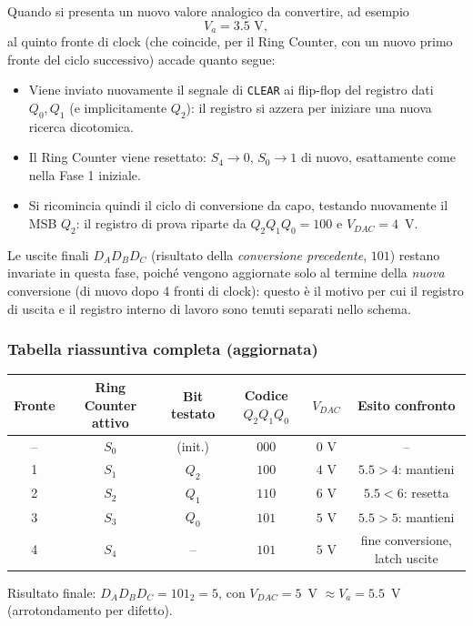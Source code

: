 \documentclass[11pt,a4paper]{report}
\begin{document}
Quando si presenta un nuovo valore analogico da convertire, ad esempio
\[
V_a = 3.5\text{ V},
\]
al quinto fronte di clock (che coincide, per il Ring Counter, con un nuovo primo fronte del ciclo successivo) accade quanto segue:

\begin{itemize}
    \item Viene inviato nuovamente il segnale di \texttt{CLEAR} ai flip-flop del registro dati $Q_0,Q_1$ (e implicitamente $Q_2$): il registro si azzera per iniziare una nuova ricerca dicotomica.
    \item Il Ring Counter viene resettato: $S_4\to 0$, $S_0 \to 1$ di nuovo, esattamente come nella Fase 1 iniziale.
    \item Si ricomincia quindi il ciclo di conversione da capo, testando nuovamente il MSB $Q_2$: il registro di prova riparte da $Q_2Q_1Q_0=100$ e $V_{DAC}=4$~V.
\end{itemize}

Le uscite finali $D_A D_B D_C$ (risultato della \emph{conversione precedente}, $101$) restano invariate in questa fase, poich\'e vengono aggiornate solo al termine della \emph{nuova} conversione (di nuovo dopo 4 fronti di clock): questo è il motivo per cui il registro di uscita e il registro interno di lavoro sono tenuti separati nello schema.

\bigskip
\subsubsection{Tabella riassuntiva completa (aggiornata)}

\begin{center}
\begin{tabular}{c c c c c c}
\hline
\textbf{Fronte} & \textbf{Ring Counter attivo} & \textbf{Bit testato} & \textbf{Codice} $Q_2Q_1Q_0$ & $V_{DAC}$ & \textbf{Esito confronto} \\
\hline
--   & $S_0$ & (init.) & $000$ & $0$ V  & -- \\
1    & $S_1$ & $Q_2$   & $100$ & $4$ V  & $5.5>4$: mantieni \\
2    & $S_2$ & $Q_1$   & $110$ & $6$ V  & $5.5<6$: resetta \\
3    & $S_3$ & $Q_0$   & $101$ & $5$ V  & $5.5>5$: mantieni \\
4    & $S_4$ & --      & $101$ & $5$ V  & fine conversione, latch uscite \\
\hline
\end{tabular}
\end{center}

Risultato finale: $D_AD_BD_C = 101_2 = 5$, con $V_{DAC}=5$~V $\approx V_a=5.5$~V (arrotondamento per difetto).
\end{document}
